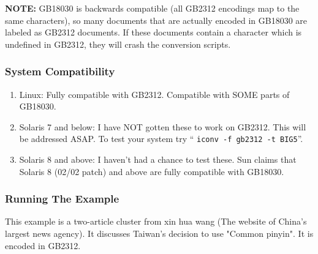 \documentclass[10pt]{article}
\begin{document}
\noindent
\textbf{NOTE:} GB18030 is backwards compatible (all GB2312 encodings map
to the same characters), so many documents that are actually encoded
in GB18030 are labeled as GB2312 documents.  If these documents
contain a character which is undefined in GB2312, they will crash the
conversion scripts.

\subsubsection{System Compatibility}

\begin{enumerate}

\item Linux: Fully compatible with GB2312. Compatible with SOME parts
of GB18030.
\item Solaris 7 and below: I have NOT gotten these to work on GB2312.
This will be addressed ASAP.  To test your system try ``
\verb|iconv -f gb2312 -t BIG5|''.

\item Solaris 8 and above: I haven't had a chance to test these. Sun
claims that Solaris 8 (02/02 patch) and above are fully compatible
with GB18030.

\end{enumerate}

\subsubsection{Running The Example}

This example is a two-article cluster from xin hua wang (The website
of China's largest news agency).  It discusses Taiwan's decision to
use "Common pinyin".  It is encoded in GB2312.
\end{document}
